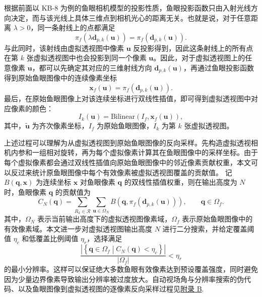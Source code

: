 根据前面以 KB-8 为例的鱼眼相机模型的投影性质，鱼眼投影函数只由入射光线方向决定，而与该光线上具体三维点到相机光心的距离无关。也就是说，对于任意距离 \(\lambda>0\)，同一条射线上的点都满足
\begin{equation}
    \label{equ:method-fisheye-ray-invariance}
    \pi_f(\lambda\mathbf{d}_{p,k}(\mathbf{u}))
    =
    \pi_f(\mathbf{d}_{p,k}(\mathbf{u})).
\end{equation}
与此同时，该射线由虚拟透视图中像素 \(\mathbf{u}\) 反投影得到，因此这条射线上的所有点在第 \(k\) 张虚拟透视图中也会投影到同一个像素 \(\mathbf{u}\)。因此，对于虚拟透视图上的任意像素 \(\mathbf{u}\)，都可以先确定其对应的三维射线方向 \(\mathbf{d}_{p,k}(\mathbf{u})\)，再通过鱼眼投影函数得到原始鱼眼图像中的连续像素坐标
\begin{equation}
    \label{equ:method-fisheye-sample-coordinate}
    \mathbf{x}_f(\mathbf{u})
    =
    \pi_f\!\left(\mathbf{d}_{p,k}(\mathbf{u})\right).
\end{equation}
最后，在原始鱼眼图像上对该连续坐标进行双线性插值，即可得到虚拟透视图中对应像素的颜色：
\begin{equation}
    \label{equ:method-fisheye-resample}
    I_k(\mathbf{u})
    =
    \mathrm{Bilinear}\!\left(I_f,\mathbf{x}_f(\mathbf{u})\right),
\end{equation}
其中，\(\tilde{\mathbf{u}}\) 为齐次像素坐标，\(I_f\) 为原始鱼眼图像，\(I_k\) 为第 \(k\) 张虚拟透视图。

上述过程可以理解为从虚拟透视图到原始鱼眼图像的反向采样。先构造虚拟透视相机内参和一组相对旋转，再为每个虚拟像素计算其在鱼眼图像中的采样坐标。由于每个虚拟像素都会通过双线性插值向原始鱼眼图像中的邻近像素贡献权重，本文可以反过来统计原鱼眼图像中每个有效像素被虚拟透视图覆盖的贡献值。
记 \(B(\mathbf{q},\mathbf{x})\) 为连续坐标 \(\mathbf{x}\) 对鱼眼像素 \(\mathbf{q}\) 的双线性插值权重，则在输出高度为 \(N\) 时，鱼眼像素 \(\mathbf{q}\) 的贡献值为
\begin{equation}
    \label{equ:method-fisheye-contribution}
    C_N(\mathbf{q})
    =
    \sum_{R_k\in\mathcal{R}}
    \sum_{\mathbf{u}\in\Omega_N}
    B\!\left(\mathbf{q}, \pi_f(\mathbf{d}_{p,k}(\mathbf{u}))\right),
    \qquad \mathbf{q}\in\Omega_f.
\end{equation}
其中，\(\Omega_N\) 表示当前输出高度下的虚拟透视图像素域，\(\Omega_f\) 表示原始鱼眼图像中的有效像素域。本文进一步对虚拟透视图输出高度 \(N\) 进行二分搜索，并给定覆盖阈值 \(\eta_c\) 和低覆盖比例阈值 \(\eta_r\)，选择满足
\begin{equation}
    \label{equ:method-contribution-condition}
    \frac{
    \left|\left\{\mathbf{q}\in\Omega_f \middle| C_N(\mathbf{q})<\eta_c\right\}\right|
    }{
    |\Omega_f|
    }
    < \eta_r
\end{equation}
的最小分辨率。这样可以保证绝大多数鱼眼有效像素达到预设覆盖强度，同时避免因为少量边界像素导致输出分辨率被过度放大。自动视场角与分辨率搜索的伪代码、以及鱼眼图像到虚拟透视图的逐像素反向采样过程见\hyperref[app:virtual-perspective]{附录 B}.

